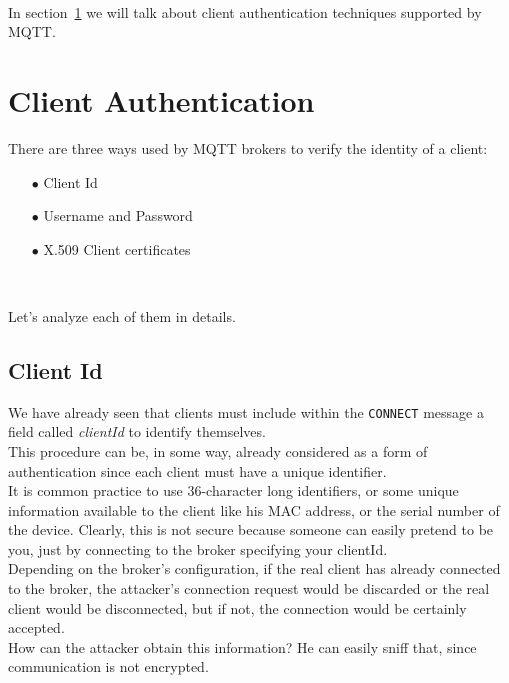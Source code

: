 \documentclass[12pt]{report}
\begin{document}
{{\begin{itemize}
\end{itemize}\

In section~\ref{sec:mqttclientauth} we will talk about client authentication techniques supported by MQTT.

\clearpage
\section{Client Authentication}
\label{sec:mqttclientauth}
\bigskip

There are three ways used by MQTT brokers to verify the identity of a client:

\begin{itemize}
\setlength{\itemindent}{+4mm}
  \item[$\bullet$] Client Id
  \item[$\bullet$] Username and Password
  \item[$\bullet$] X.509 Client certificates
\end{itemize}\

Let's analyze each of them in details.\\


\subsection{Client Id}
\bigskip
We have already seen that clients must include within the \texttt{CONNECT} message a field called \emph{clientId} to identify themselves.\\
This procedure can be, in some way, already considered as a form of authentication since each client must have a unique identifier.\\
It is common practice to use 36-character long identifiers, or some unique information available to the client like his MAC address, or the serial number of the device.
Clearly, this is not secure because someone can easily pretend to be you, just by connecting to the broker specifying your clientId.\\
Depending on the broker's configuration, if the real client has already connected to the broker, the attacker's connection request would be discarded or the real client would be disconnected, but if not, the connection would be certainly accepted.\\

How can the attacker obtain this information? He can easily sniff that, since communication is not encrypted.\\

}}
\end{document}

